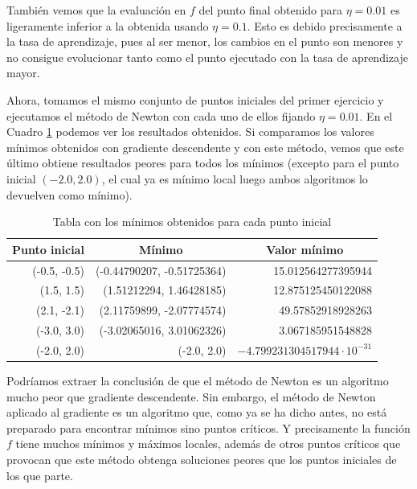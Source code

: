 \documentclass[10pt,a4paper]{article}
\begin{document}
También vemos que la evaluación en $f$ del punto final obtenido para $\eta  = 0.01$ es ligeramente inferior a la obtenida usando $\eta = 0.1$. Esto es debido precisamente a la tasa de aprendizaje, pues al ser menor, los cambios en el punto son menores y no consigue evolucionar tanto como el punto ejecutado con la tasa de aprendizaje mayor. 

Ahora, tomamos el mismo conjunto de puntos iniciales del primer ejercicio y ejecutamos el método de Newton con cada uno de ellos fijando $\eta = 0.01$. En el Cuadro \ref{fig:bonus_puntos_iniciales} podemos ver los resultados obtenidos. Si comparamos los valores mínimos obtenidos con gradiente descendente y con este método, vemos que este último obtiene resultados peores para todos los mínimos (excepto para el punto inicial $(-2.0, 2.0)$, el cual ya es mínimo local luego ambos algoritmos lo devuelven como mínimo).

\begin{table}[]
	\centering
	\begin{tabular}{|r|r|r|}
		\hline
		\multicolumn{1}{|c|}{\textbf{Punto inicial}} & \multicolumn{1}{c|}{\textbf{Mínimo}} & \multicolumn{1}{c|}{\textbf{Valor mínimo}}                          \\ \hline
		(-0.5, -0.5)                                 & (-0.44790207, -0.51725364)           & 15.012564277395944                                                   \\ \hline
		(1.5, 1.5)                                   & (1.51212294, 1.46428185)             & 12.875125450122088                                                   \\ \hline
		(2.1, -2.1)                                  & (2.11759899, -2.07774574)             & 49.57852918928263                                                  \\ \hline
		(-3.0, 3.0)                                  & (-3.02065016, 3.01062326)            & 3.067185951548828                                                \\ \hline
		(-2.0, 2.0)                                  & (-2.0, 2.0)                          & $-4.799231304517944 \cdot 10^{-31}$                                 \\ \hline
	\end{tabular}
	\caption{Tabla con los mínimos obtenidos para cada punto inicial}
	\label{fig:bonus_puntos_iniciales}
\end{table}

Podríamos extraer la conclusión de que el método de Newton es un algoritmo mucho peor que gradiente descendente. Sin embargo, el método de Newton aplicado al gradiente es un algoritmo que, como ya se ha dicho antes, no está preparado para encontrar mínimos sino puntos críticos. Y precisamente la función $f$ tiene muchos mínimos y máximos locales, además de otros puntos críticos que provocan que este método obtenga soluciones peores que los puntos iniciales de los que parte.
\end{document}
